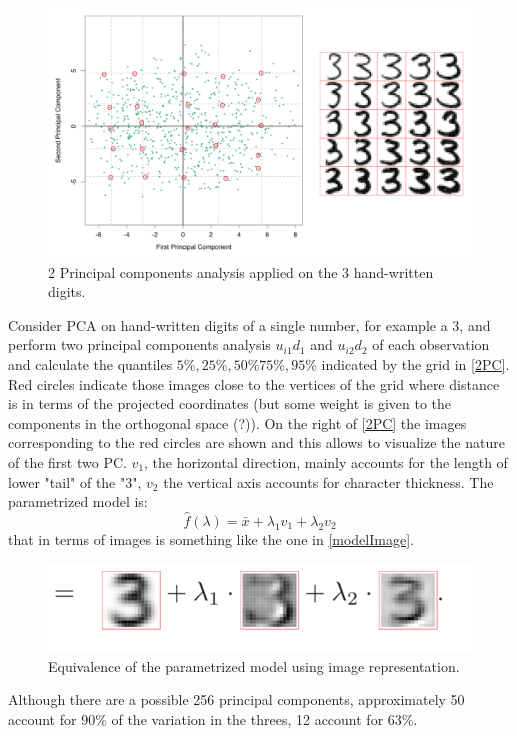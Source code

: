 \begin{figure}
\centering
\includegraphics[scale=0.5]{img/2PC}
\caption{2 Principal components analysis applied on the $3$ hand-written digits.}
\label{2PC}
\end{figure}
Consider PCA on hand-written digits of a single number, for example a $3$, and perform two principal components analysis $u_{i1}d_1$ and $u_{i2}d_2$ of each observation and calculate the quantiles $5\%, 25\%, 50\% 75\%, 95\%$ indicated by the grid in \autoref{2PC}. Red circles indicate those images close to the vertices of the grid where distance is in terms of the projected coordinates (but some weight is given to the components in the orthogonal space (?)). On the right of \autoref{2PC} the images corresponding to the red circles are shown and this allows to visualize the nature of the first two PC. $v_1$, the horizontal direction, mainly accounts for the length of lower "tail" of the "$3$", $v_2$ the vertical axis  accounts for character thickness. The parametrized model is:
\begin{equation}
\hat{f}(\lambda) = \bar{x} + \lambda_1 v_1+\lambda_2 v_2 
\end{equation}
that in terms of images is something like the one in \autoref{modelImage}.


\begin{figure}
\centering
\includegraphics[scale=0.7]{img/modelImage}
\caption{Equivalence of the parametrized model using image representation.}
\label{modelImage}
\end{figure}
Although there are a possible 256 principal components, approximately 50 account for 90\% of the variation in the threes, 12 account for 63\%.

